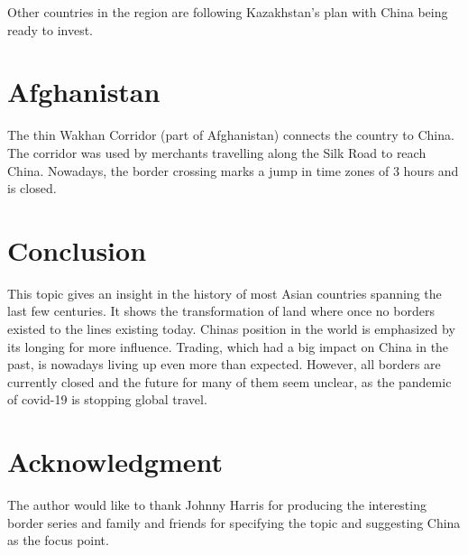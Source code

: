 \documentclass[conference]{IEEEtran}
\begin{document}
	Other countries in the region are following Kazakhstan's plan with China being ready to invest.
	
	\section{Afghanistan}
	The thin Wakhan Corridor (part of Afghanistan) connects the country to China. The corridor was used by merchants travelling along the Silk Road to reach China. Nowadays, the border crossing marks a jump in time zones of 3 hours and is closed.
	
	\section{Conclusion}
	This topic gives an insight in the history of most Asian countries spanning the last few centuries. It shows the transformation of land where once no borders existed to the lines existing today. Chinas position in the world is emphasized by its longing for more influence. Trading, which had a big impact on China in the past, is nowadays living up even more than expected. However, all borders are currently closed and the future for many of them seem unclear, as the pandemic of covid-19 is stopping global travel.
	
	\section*{Acknowledgment}
	The author would like to thank Johnny Harris for producing the interesting border series and family and friends for specifying the topic and suggesting China as the focus point.
	
	
	
\end{document}
